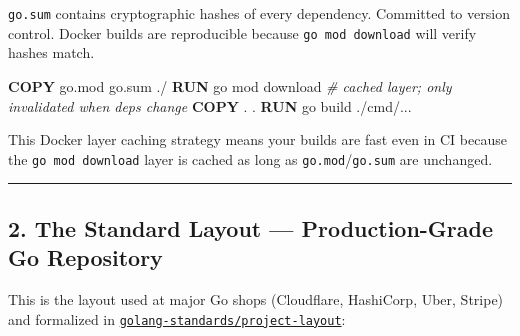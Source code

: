 \documentclass[
]{article}
\newenvironment{Shaded}{}{}
\newcommand{\CommentTok}[1]{\textcolor[rgb]{0.38,0.63,0.69}{\textit{#1}}}
\newcommand{\ExtensionTok}[1]{#1}
\newcommand{\KeywordTok}[1]{\textcolor[rgb]{0.00,0.44,0.13}{\textbf{#1}}}
\newcommand{\NormalTok}[1]{#1}
\begin{document}
\texttt{go.sum} contains cryptographic hashes of every dependency.
Committed to version control. Docker builds are reproducible because
\texttt{go\ mod\ download} will verify hashes match.

\begin{Shaded}
\begin{Highlighting}[]
\KeywordTok{COPY}\NormalTok{ go.mod go.sum ./}
\KeywordTok{RUN} \ExtensionTok{go}\NormalTok{ mod download  }\CommentTok{\# cached layer; only invalidated when deps change}
\KeywordTok{COPY}\NormalTok{ . .}
\KeywordTok{RUN} \ExtensionTok{go}\NormalTok{ build ./cmd/...}
\end{Highlighting}
\end{Shaded}

This Docker layer caching strategy means your builds are fast even in CI
because the \texttt{go\ mod\ download} layer is cached as long as
\texttt{go.mod}/\texttt{go.sum} are unchanged.

\begin{center}\rule{0.5\linewidth}{0.5pt}\end{center}

\hypertarget{the-standard-layout-production-grade-go-repository}{%
\subsection{2. The Standard Layout --- Production-Grade Go
Repository}\label{the-standard-layout-production-grade-go-repository}}

This is the layout used at major Go shops (Cloudflare, HashiCorp, Uber,
Stripe) and formalized in
\href{https://github.com/golang-standards/project-layout}{\texttt{golang-standards/project-layout}}:
\end{document}
